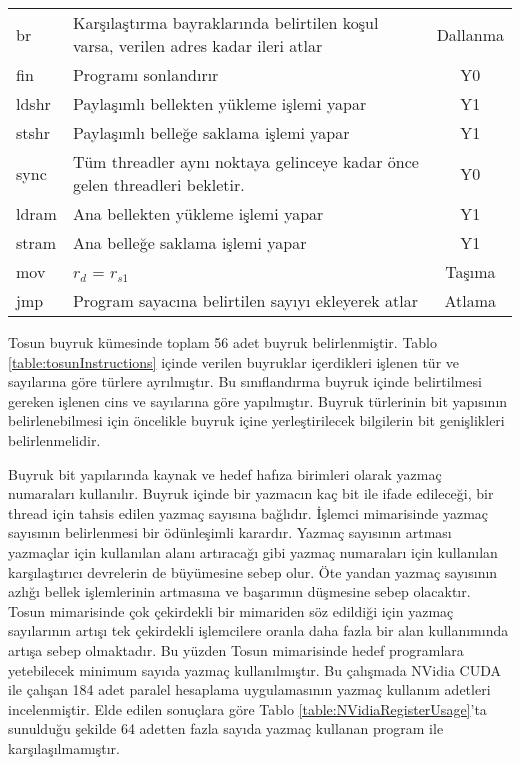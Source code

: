 \begin{longtable}{p{50pt} p{300pt} p{70pt}}
  br 			&	 Karşılaştırma bayraklarında belirtilen koşul varsa, verilen adres kadar ileri atlar & \multicolumn{1}{c}{Dallanma}  \\
  fin 		&	 Programı sonlandırır& \multicolumn{1}{c}{Y0}  \\
  ldshr 	&	 Paylaşımlı bellekten yükleme işlemi yapar& \multicolumn{1}{c}{Y1}  \\
  stshr 	&	 Paylaşımlı belleğe saklama işlemi yapar& \multicolumn{1}{c}{Y1}  \\
  sync		&	 Tüm threadler aynı noktaya gelinceye kadar önce gelen threadleri bekletir. & \multicolumn{1}{c}{Y0}  \\
  ldram 	&	 Ana bellekten yükleme işlemi yapar& \multicolumn{1}{c}{Y1}  \\
  stram		&	 Ana belleğe saklama işlemi yapar& \multicolumn{1}{c}{Y1}  \\
  mov 		&  $r_{d}$ = $r_{s1}$ 						&	\multicolumn{1}{c}{Taşıma}		 \\
  jmp  		&  Program sayacına belirtilen sayıyı ekleyerek atlar &	\multicolumn{1}{c}{Atlama}		 \\
  
\end{longtable}

Tosun buyruk kümesinde toplam 56 adet buyruk belirlenmiştir. Tablo \ref{table:tosunInstructions} içinde verilen buyruklar içerdikleri işlenen tür ve sayılarına göre türlere ayrılmıştır. Bu sınıflandırma buyruk içinde belirtilmesi gereken işlenen cins ve sayılarına göre yapılmıştır. Buyruk türlerinin bit yapısının belirlenebilmesi için öncelikle buyruk içine yerleştirilecek bilgilerin bit genişlikleri belirlenmelidir. \par

Buyruk bit yapılarında kaynak ve hedef hafıza birimleri olarak yazmaç numaraları kullanılır. Buyruk içinde bir yazmacın kaç bit ile ifade edileceği, bir thread için tahsis edilen yazmaç sayısına bağlıdır. İşlemci mimarisinde yazmaç sayısının belirlenmesi bir ödünleşimli karardır. Yazmaç sayısının artması yazmaçlar için kullanılan alanı artıracağı gibi yazmaç numaraları için kullanılan karşılaştırıcı devrelerin de büyümesine sebep olur. Öte yandan yazmaç sayısının azlığı bellek işlemlerinin artmasına ve başarımın düşmesine sebep olacaktır. Tosun mimarisinde çok çekirdekli bir mimariden söz edildiği için yazmaç sayılarının artışı tek çekirdekli işlemcilere oranla daha fazla bir alan kullanımında artışa sebep olmaktadır. Bu yüzden Tosun mimarisinde hedef programlara yetebilecek minimum sayıda yazmaç kullanılmıştır. Bu çalışmada NVidia CUDA ile çalışan 184 adet paralel hesaplama uygulamasının yazmaç kullanım adetleri incelenmiştir. Elde edilen sonuçlara göre Tablo \ref{table:NVidiaRegisterUsage}'ta sunulduğu şekilde 64 adetten fazla sayıda yazmaç kullanan program ile karşılaşılmamıştır.

